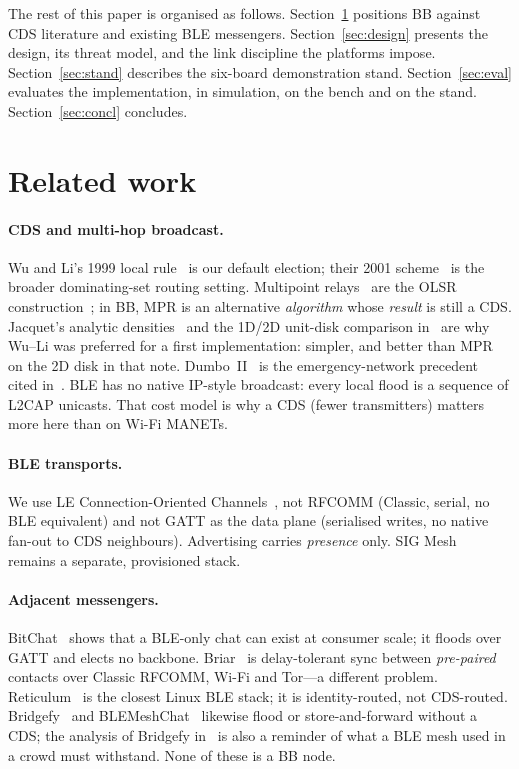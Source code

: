 \documentclass[conference,10pt]{IEEEtran}
\begin{document}
The rest of this paper is organised as follows.
Section~\ref{sec:related} positions BB against CDS literature and existing
BLE messengers. Section~\ref{sec:design} presents the design, its threat
model, and the link discipline the platforms impose.
Section~\ref{sec:stand} describes the six-board demonstration stand.
Section~\ref{sec:eval} evaluates the implementation, in simulation, on
the bench and on the stand.
Section~\ref{sec:concl} concludes.

\section{Related work}
\label{sec:related}

\paragraph{CDS and multi-hop broadcast.}
Wu and Li's 1999 local rule~\cite{wuli1999} is our default election; their
2001 scheme~\cite{wuli2001} is the broader dominating-set routing setting.
Multipoint relays~\cite{qayyum2002} are the OLSR
construction~\cite{rfc3626}; in BB, MPR is an alternative
\emph{algorithm} whose \emph{result} is still a CDS. Jacquet's analytic
densities~\cite{jacquet2004} and the 1D/2D unit-disk comparison
in~\cite{achir2025bb} are why Wu--Li was preferred for a first
implementation: simpler, and better than MPR on the 2D disk in that note.
Dumbo~II~\cite{dumbo2008} is the emergency-network precedent cited
in~\cite{achir2025bb}. BLE has no native IP-style broadcast: every local
flood is a sequence of L2CAP unicasts. That cost model is why a CDS
(fewer transmitters) matters more here than on Wi-Fi MANETs.

\paragraph{BLE transports.}
We use LE Connection-Oriented Channels~\cite{btcore}, not RFCOMM
(Classic, serial, no BLE equivalent) and not GATT as the data plane
(serialised writes, no native fan-out to CDS neighbours). Advertising
carries \emph{presence} only. SIG Mesh~\cite{mesh-profile} remains a
separate, provisioned stack.

\paragraph{Adjacent messengers.}
BitChat~\cite{bitchat} shows that a BLE-only chat can exist at consumer
scale; it floods over GATT and elects no backbone. Briar~\cite{briar} is
delay-tolerant sync between \emph{pre-paired} contacts over Classic
RFCOMM, Wi-Fi and Tor---a different problem. Reticulum~\cite{reticulum} is
the closest Linux BLE stack; it is identity-routed, not CDS-routed.
Bridgefy~\cite{bridgefy,albrecht2021} and
BLEMeshChat~\cite{blemeshchat} likewise flood or store-and-forward without
a CDS; the analysis of Bridgefy in~\cite{albrecht2021} is also a reminder
of what a BLE mesh used in a crowd must withstand. None of these is a BB
node.
\end{document}
